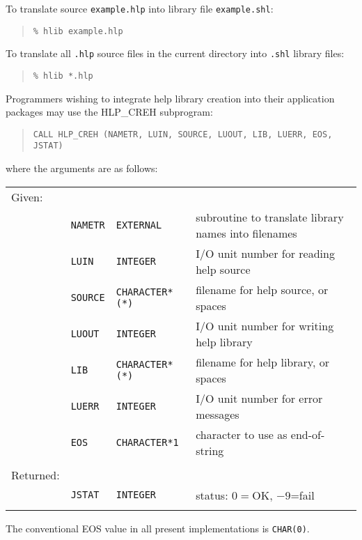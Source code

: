 To translate source {\tt example.hlp} into library file {\tt example.shl}:
\begin{verse}
{\tt \% hlib example.hlp}
\end{verse}
To translate all {\tt *.hlp} source files in the current directory
into {\tt *.shl} library files:
\begin{verse}
{\tt \% hlib *.hlp}
\end{verse}

Programmers wishing to integrate help library creation into their
application packages may use the HLP\_CREH subprogram:
\begin{verse}
{\tt  CALL HLP\_CREH (NAMETR, LUIN, SOURCE, LUOUT, LIB, LUERR, EOS, JSTAT)}
\end{verse}
where the arguments are as follows:

\begin{tabular}{llll}
\\
Given: \\
& {\tt NAMETR} & {\tt EXTERNAL} &
              subroutine to translate library names into filenames \\
& {\tt LUIN} & {\tt INTEGER} &
                           I/O unit number for reading help source \\
& {\tt SOURCE} & {\tt CHARACTER*(*)} &
                               filename for help source, or spaces \\
& {\tt LUOUT} & {\tt INTEGER} &
                          I/O unit number for writing help library \\
& {\tt LIB} & {\tt CHARACTER*(*)} &
                              filename for help library, or spaces \\
& {\tt LUERR} & {\tt INTEGER} &
                                I/O unit number for error messages \\
& {\tt EOS} & {\tt CHARACTER*1} &
                                 character to use as end-of-string \\ \\
Returned: \\
& {\tt JSTAT} & {\tt INTEGER} &
                                         status: $0=$OK, $-9$=fail \\ \\
\end{tabular}

The conventional EOS value in all present implementations is {\tt CHAR(0)}.


